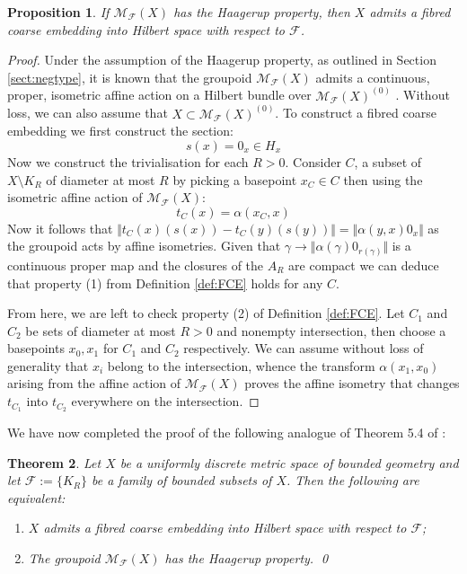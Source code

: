 \documentclass[preprint]{elsarticle}
\theoremstyle{plain}
\newtheorem{theorem}{Theorem}%
\newtheorem{proposition}[theorem]{Proposition}%
\theoremstyle{definition}%
\theoremstyle{remark}%
\begin{document}
\begin{proposition}
If $\mathcal{M}_{\mathcal{F}}(X)$ has the Haagerup property, then $X$ admits a fibred coarse embedding into Hilbert space with respect to $\mathcal{F}$.
\end{proposition} 
\begin{proof}
Under the assumption of the Haagerup property, as outlined in Section \ref{sect:negtype}, it is known that the groupoid $\mathcal{M}_{\mathcal{F}}(X)$ admits a continuous, proper, isometric affine action on a Hilbert bundle over $\mathcal{M}_{\mathcal{F}}(X)^{(0)}$ \cite{MR1703305,Renault2012}. Without loss, we can also assume that $X \subset \mathcal{M}_{\mathcal{F}}(X)^{(0)}$. To construct a fibred coarse embedding we first construct the section:
\begin{equation*}
s(x) = 0_{x} \in H_{x}
\end{equation*}
Now we construct the trivialisation for each $R>0$. Consider $C$, a subset of $X\setminus K_{R}$ of diameter at most $R$ by picking a basepoint $x_{C} \in C$ then using the isometric affine action of $\mathcal{M}_{\mathcal{F}}(X)$:
\begin{equation*}
t_{C}(x)=\alpha(x_{C},x)
\end{equation*}
Now it follows that $\Vert t_{C}(x)(s(x)) - t_{C}(y)(s(y)) \Vert = \Vert \alpha(y,x)0_{x} \Vert$ as the groupoid acts by affine isometries. Given that $\gamma \rightarrow \Vert \alpha(\gamma)0_{r(\gamma)} \Vert$ is a continuous proper map and the closures of the $A_{R}$ are compact we can deduce that property (1) from Definition \ref{def:FCE} holds for any $C$. 

From here, we are left to check property (2) of Definition \ref{def:FCE}. Let $C_{1}$ and $C_{2}$ be sets of diameter at most $R>0$ and nonempty intersection, then choose a basepoints $x_{0}, x_{1}$ for $C_{1}$ and $C_{2}$ respectively. We can assume without loss of generality that $x_{i}$ belong to the intersection, whence the transform $\alpha(x_{1},x_{0})$ arising from the affine action of $\mathcal{M}_{\mathcal{F}}(X)$ proves the affine isometry that changes $t_{C_{1}}$ into $t_{C_{2}}$ everywhere on the intersection. 
\end{proof}

We have now completed the proof of the following analogue of Theorem 5.4 of \cite{MR1905840}:

\begin{theorem}
Let $X$ be a uniformly discrete metric space of bounded geometry and let $\mathcal{F}:=\lbrace K_{R} \rbrace$ be a family of bounded subsets of $X$. Then the following are equivalent:
\begin{enumerate}
\item $X$ admits a fibred coarse embedding into Hilbert space with respect to $\mathcal{F}$;
\item The groupoid $\mathcal{M}_{\mathcal{F}}(X)$ has the Haagerup property. \qed
\end{enumerate}
\end{theorem}
\end{document}
